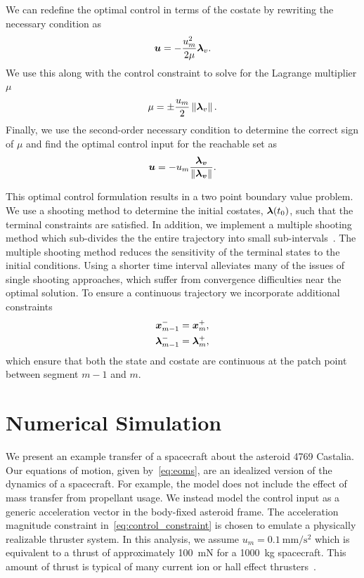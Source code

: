 \documentclass[]{aiaa-tc}%
\begin{document}
We can redefine the optimal control in terms of the costate by rewriting the necessary condition as
\begin{align*}
    \bm{u} = - \frac{u_m^2}{2 \mu} \bm{\lambda}_v .
\end{align*}
We use this along with the control constraint to solve for the Lagrange multiplier \( \mu \)
\begin{align*}
    \mu = \pm \frac{u_m}{2} \left\| \bm{\lambda}_v \right\| .
\end{align*}
Finally, we use the second-order necessary condition to determine the correct sign of \( \mu \) and find the optimal control input for the reachable set as
\begin{align}\label{eq:optimal_control}
    \bm{u} = - u_m \frac{\bm{\lambda_{\bm{v}}}}{\left\| \bm{\lambda_{\bm{v}}} \right\|} .
\end{align}

This optimal control formulation results in a two point boundary value problem.
We use a shooting method to determine the initial costates, \( \bm{\lambda}(t_0)\), such that the terminal constraints are satisfied.
In addition, we implement a multiple shooting method which sub-divides the the entire trajectory into small sub-intervals~\cite{stoer2013}.
The multiple shooting method reduces the sensitivity of the terminal states to the initial conditions.
Using a shorter time interval alleviates many of the issues of single shooting approaches, which suffer from convergence difficulties near the optimal solution.
To ensure a continuous trajectory we incorporate additional constraints
\begin{align}\label{sec:interior_constraints}
    \bm{x}_{m-1}^{-} &= \bm{x}_m^{+} , \\
    \bm{\lambda}_{m-1}^{-} &= \bm{\lambda}_m^{+},
\end{align}
which ensure that both the state and costate are continuous at the patch point between segment \( m-1 \) and \( m\).

\section{Numerical Simulation}\label{sec:simulation}

We present an example transfer of a spacecraft about the asteroid 4769 Castalia. 
Our equations of motion, given by~\cref{eq:eoms}, are an idealized version of the dynamics of a spacecraft.
For example, the model does not include the effect of mass transfer from propellant usage. 
We instead model the control input as a generic acceleration vector in the body-fixed asteroid frame. 
The acceleration magnitude constraint in~\cref{eq:control_constraint} is chosen to emulate a physically realizable thruster system.
In this analysis, we assume \( u_m = \SI{0.1}{\milli\meter\per\second\squared}\) which is equivalent to a thrust of approximately \SI{100}{\milli\newton} for a \SI{1000}{\kilo\gram} spacecraft.
This amount of thrust is typical of many current ion or hall effect thrusters~\cite{goebel2008 ,choueiri2009}.
\end{document}
